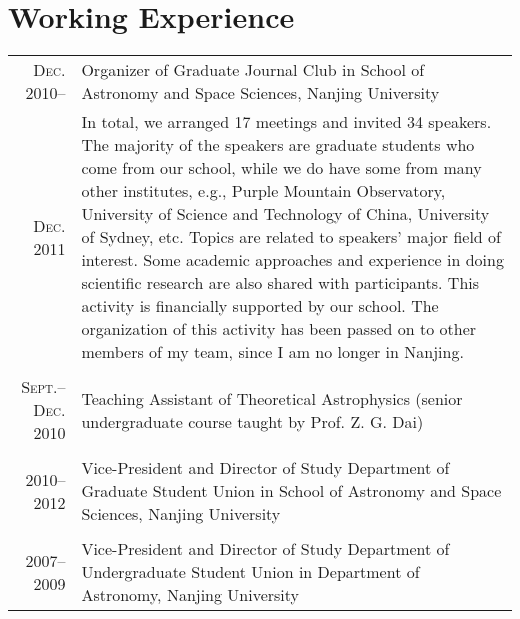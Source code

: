 \documentclass[10pt]{article}
\begin{document}
\section{Working Experience}
\begin{tabular}{rp{16cm}}
\textsc{Dec. 2010}--  & Organizer of Graduate Journal Club in School of Astronomy and Space Sciences, Nanjing University \\
\textsc{Dec. 2011}    & \small{In total, we arranged 17 meetings and invited 34 speakers. The majority of the speakers are graduate students who come from our school, while we do have some from many other institutes, e.g., Purple Mountain Observatory, University of Science and Technology of China, University of Sydney, etc. Topics are related to speakers' major field of interest. Some academic approaches and experience in doing scientific research are also shared with participants. This activity is financially supported by our school. The organization of this activity has been passed on to other members of my team, since I am no longer in Nanjing.}  \\
\multicolumn{2}{c}{} \\
\textsc{\small Sept.--Dec. 2010}  & Teaching Assistant of Theoretical Astrophysics (senior undergraduate course taught by Prof. Z. G. Dai) \\
\multicolumn{2}{c}{} \\
\textsc{2010--2012}  & Vice-President and Director of Study Department of Graduate Student Union in School of Astronomy and Space Sciences, Nanjing University\\
\multicolumn{2}{c}{} \\
\textsc{2007--2009}  & Vice-President and Director of Study Department of Undergraduate Student Union in Department of Astronomy, Nanjing University\\

\end{tabular}


\end{document}
